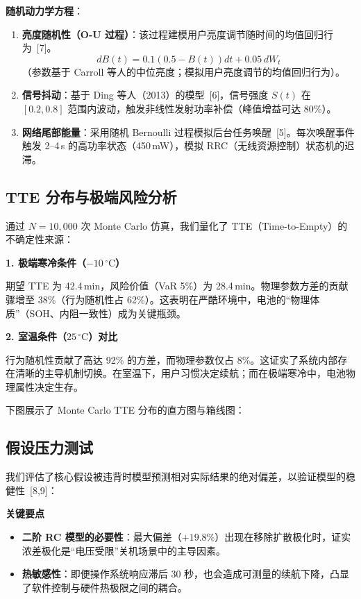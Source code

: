 \documentclass[11pt,a4paper]{ctexart}
\newcommand{\degC}{\ensuremath{^{\circ}\mathrm{C}}}
\begin{document}
\textbf{随机动力学方程}：

\begin{enumerate}
\item \textbf{亮度随机性（O-U 过程）}：该过程建模用户亮度调节随时间的均值回归行为~[7]。
\begin{equation}
dB(t)=0.1(0.5-B(t))dt+0.05\,dW_t
\end{equation}
（参数基于 Carroll 等人的中位亮度；模拟用户亮度调节的均值回归行为）。
\item \textbf{信号抖动}：基于 Ding 等人（2013）的模型~[6]，信号强度 $S(t)$ 在 $[0.2,0.8]$ 范围内波动，触发非线性发射功率补偿（峰值增益可达 80\%）。
\item \textbf{网络尾部能量}：采用随机 Bernoulli 过程模拟后台任务唤醒~[5]。每次唤醒事件触发 2--4\,s 的高功率状态（450\,mW），模拟 RRC（无线资源控制）状态机的迟滞。
\end{enumerate}

\subsection{TTE 分布与极端风险分析}

通过 $N=10{,}000$ 次 Monte Carlo 仿真，我们量化了 TTE（Time-to-Empty）的不确定性来源：

\textbf{1. 极端寒冷条件（$-10\,\degC$）}

期望 TTE 为 42.4\,min，风险价值（VaR 5\%）为 28.4\,min。物理参数方差的贡献骤增至 38\%（行为随机性占 62\%）。这表明在严酷环境中，电池的“物理体质”（SOH、内阻一致性）成为关键瓶颈。

\textbf{2. 室温条件（$25\,\degC$）对比}

行为随机性贡献了高达 92\% 的方差，而物理参数仅占 8\%。这证实了系统内部存在清晰的主导机制切换。在室温下，用户习惯决定续航；而在极端寒冷中，电池物理属性决定生存。

下图展示了 Monte Carlo TTE 分布的直方图与箱线图：

\subsection{假设压力测试}

我们评估了核心假设被违背时模型预测相对实际结果的绝对偏差，以验证模型的稳健性~[8,9]：

\textbf{关键要点}

\begin{itemize}
\item \textbf{二阶 RC 模型的必要性}：最大偏差（$+19.8\%$）出现在移除扩散极化时，证实浓差极化是“电压受限”关机场景中的主导因素。
\item \textbf{热敏感性}：即便操作系统响应滞后 30 秒，也会造成可测量的续航下降，凸显了软件控制与硬件热极限之间的耦合。
\end{itemize}
\end{document}

